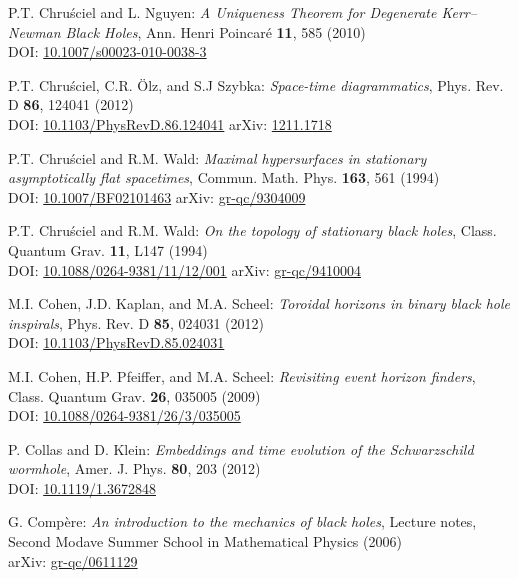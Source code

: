 \begin{thebibliography}{123}
P.T. Chru\'sciel and L. Nguyen:
{\em A Uniqueness Theorem for Degenerate Kerr–Newman Black Holes},
Ann. Henri Poincar\'e {\bf 11}, 585 (2010)\\
DOI: \href{https://doi.org/10.1007/s00023-010-0038-3}{10.1007/s00023-010-0038-3}

P.T. Chru\'sciel, C.R. Ölz, and S.J Szybka:
{\em Space-time diagrammatics},
Phys. Rev. D {\bf 86}, 124041 (2012)\\
DOI:  \href{https://doi.org/10.1103/PhysRevD.86.124041}{10.1103/PhysRevD.86.124041}\hfill
arXiv: \href{https://arxiv.org/abs/1211.1718}{1211.1718}

P.T. Chru\'sciel and R.M. Wald:
{\em Maximal hypersurfaces in stationary asymptotically flat spacetimes},
Commun. Math. Phys. {\bf 163}, 561 (1994)\\
DOI: \href{https://doi.org/10.1007/BF02101463}{10.1007/BF02101463}\hfill
arXiv: \href{https://arxiv.org/abs/gr-qc/9304009}{gr-qc/9304009}

P.T. Chru\'sciel and R.M. Wald:
{\em On the topology of stationary black holes},
Class. Quantum Grav. {\bf 11}, L147 (1994)\\
DOI: \href{https://doi.org/10.1088/0264-9381/11/12/001}{10.1088/0264-9381/11/12/001}\hfill
arXiv: \href{https://arxiv.org/abs/gr-qc/9410004}{gr-qc/9410004}

M.I. Cohen, J.D. Kaplan, and M.A. Scheel:
{\em Toroidal horizons in binary black hole inspirals},
Phys. Rev. D {\bf 85}, 024031 (2012)\\
DOI:  \href{https://doi.org/10.1103/PhysRevD.85.024031}{10.1103/PhysRevD.85.024031}

M.I. Cohen, H.P. Pfeiffer, and M.A. Scheel:
{\em Revisiting event horizon finders},
Class. Quantum Grav. {\bf 26}, 035005 (2009)\\
DOI: \href{https://doi.org/10.1088/0264-9381/26/3/035005}{10.1088/0264-9381/26/3/035005}

P. Collas and D. Klein:
{\em Embeddings and time evolution of the Schwarzschild wormhole},
Amer. J. Phys. {\bf 80}, 203 (2012)\\
DOI: \href{https://doi.org/10.1119/1.3672848}{10.1119/1.3672848}

G. Compère:
{\em An introduction to the mechanics of black holes},
Lecture notes, Second Modave Summer School in Mathematical Physics (2006)\\
arXiv: \href{https://arxiv.org/abs/gr-qc/0611129}{gr-qc/0611129}


\end{thebibliography}

